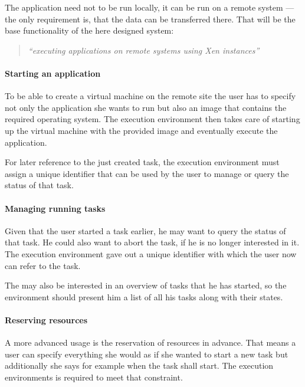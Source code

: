 The application  need not to  be run  locally, it can  be run on  a remote
system  --- the  only requirement  is, that  the data  can  be transferred
there.  That will be the base functionality of the here designed system:

\begin{quote}
  \emph{``executing applications on remote systems using Xen instances''}
\end{quote}

\paragraph{Starting an application}

To be able to create a virtual  machine on the remote site the user has to
specify not only  the application she wants to run but  also an image that
contains the  required operating  system.  The execution  environment then
takes care of starting up the  virtual machine with the provided image and
eventually execute the application.

For later  reference to the  just created task, the  execution environment
must assign a unique identifier that can  be used by the user to manage or
query the status of that task.

\paragraph{Managing running tasks}

Given  that the user  started a  task earlier,  he may  want to  query the
status of  that task. He could  also want to abort  the task, if  he is no
longer  interested in  it. The  execution  environment gave  out a  unique
identifier with which the user now can refer to the task.

The may also be interested in an overview of tasks that he has started, so
the environment  should present  him a  list of all  his tasks  along with
their states.

\paragraph{Reserving resources}

A more  advanced usage  is the reservation  of resources in  advance. That
means a user can specify everything she  would as if she wanted to start a
new task but additionally she says  for example when the task shall start. 
The execution environments is required to meet that constraint.

